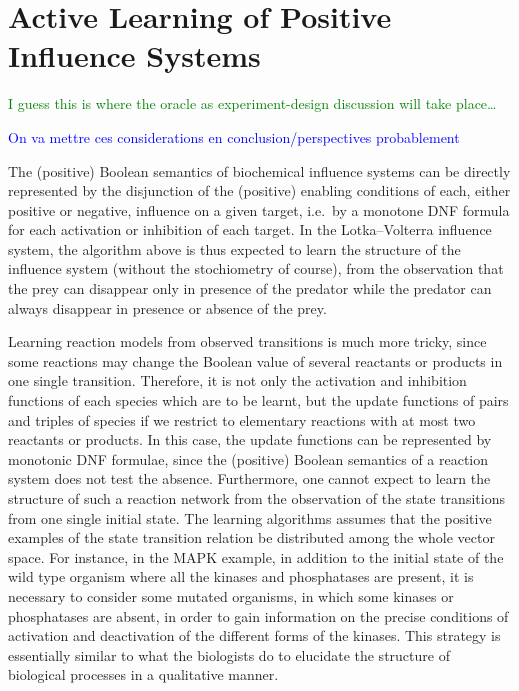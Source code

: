 \documentclass{llncs}
\newcommand{\francois}[1]{\textcolor{blue}{#1}}
\newcommand{\sylvain}[1]{\textcolor{green}{#1}}
\begin{document}
\section{Active Learning of Positive Influence Systems}
\label{sec:oracles}

\sylvain{I guess this is where the oracle as experiment-design discussion will
take place\dots}

\francois{On va mettre ces considerations en conclusion/perspectives probablement}

The (positive) Boolean semantics of biochemical influence systems
can be directly represented by the disjunction of the (positive) enabling conditions of each, either positive or negative, influence on a given target,
i.e.~by a monotone DNF formula for each activation or inhibition of each target.
In the Lotka--Volterra influence system, the algorithm above is thus expected to learn the structure of the influence system
(without the stochiometry of course),
from the observation that the prey can disappear only in presence of the predator
while the predator can always disappear in presence or absence of the prey.

  Learning reaction models from observed transitions is much more tricky,
  since some reactions may change the Boolean value of several reactants or products in one single transition.
  Therefore, it is not only the activation and inhibition functions of each species which are to be learnt,
  but the update functions of pairs and triples of species if we restrict to elementary reactions with at most two reactants or products.
  In this case, the update functions can be represented by monotonic DNF formulae, since the (positive) Boolean semantics of a reaction system does not test the absence.
Furthermore,   one cannot expect to learn the structure of such a reaction network
from the observation of the state transitions from one single initial state.
The learning algorithms assumes that the positive examples of the state transition relation be distributed
among the whole vector space.
For instance, in the MAPK example, in addition to the initial state of the wild type organism where all the kinases and phosphatases are present,
it is necessary to consider some mutated organisms, in which some kinases or phosphatases are absent,
in order to gain information on the precise conditions of activation and deactivation of the different forms of the kinases.
This strategy is essentially similar to what the biologists do to elucidate the structure of biological processes
in a qualitative manner.
\end{document}

